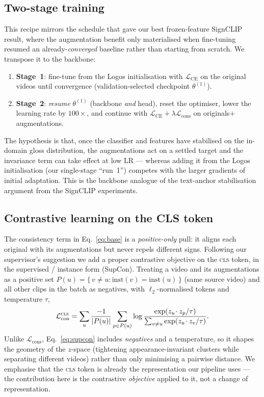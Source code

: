 \subsection{Two-stage training}
\label{sec:twostage}
This recipe mirrors the schedule that gave our best frozen-feature SignCLIP result, where the
augmentation benefit only materialised when fine-tuning resumed an already-\emph{converged}
baseline rather than starting from scratch. We transpose it to the backbone:
\begin{enumerate}
  \item \textbf{Stage~1}: fine-tune from the Logos initialisation with $\mathcal{L}_{\mathrm{CE}}$
  on the original videos until convergence (validation-selected checkpoint $\theta^{(1)}$).
  \item \textbf{Stage~2}: \emph{resume} $\theta^{(1)}$ (backbone \emph{and} head), reset the
  optimiser, lower the learning rate by $100\times$, and continue with
  $\mathcal{L}_{\mathrm{CE}}+\lambda\mathcal{L}_{\mathrm{cons}}$ on originals${+}$augmentations.
\end{enumerate}
The hypothesis is that, once the classifier and features have stabilised on the in-domain gloss
distribution, the augmentations act on a settled target and the invariance term can take effect
at low LR --- whereas adding it from the Logos initialisation (our single-stage ``run~1'')
competes with the larger gradients of initial adaptation. This is the backbone analogue of the
text-anchor stabilisation argument from the SignCLIP experiments.

\subsection{Contrastive learning on the CLS token}
\label{sec:clscontrast}
The consistency term in Eq.~\eqref{eq:base} is a \emph{positive-only} pull: it aligns each
original with its augmentations but never repels different signs. Following our supervisor's
suggestion we add a proper contrastive objective on the \textsc{cls} token, in the supervised /
instance form (SupCon). Treating a video and its augmentations as a positive set
$P(u)=\{\,v \neq u : \mathrm{inst}(v)=\mathrm{inst}(u)\,\}$ (same source video) and all other
clips in the batch as negatives, with $\ell_2$-normalised tokens and temperature $\tau$,
\begin{equation}
\mathcal{L}_{\mathrm{con}}^{\textsc{cls}} =
\sum_{u}\frac{-1}{|P(u)|}\sum_{p\in P(u)}
\log\frac{\exp(z_u\!\cdot z_p/\tau)}{\sum_{v\neq u}\exp(z_u\!\cdot z_v/\tau)} .
\label{eq:supcon}
\end{equation}
Unlike $\mathcal{L}_{\mathrm{cons}}$, Eq.~\eqref{eq:supcon} includes \emph{negatives} and a
temperature, so it shapes the geometry of the $z$-space (tightening appearance-invariant
clusters while separating different videos) rather than only minimising a pairwise distance.
We emphasise that the \textsc{cls} token is already the representation our pipeline uses --- the
contribution here is the contrastive \emph{objective} applied to it, not a change of
representation.

